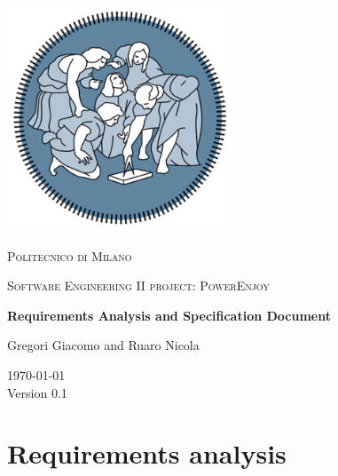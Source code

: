 \documentclass[openright]{report}
\def \version {0.1}
\begin{document}
	\begin{titlepage}
		\centering
		\includegraphics[width=0.50\textwidth]{polimi}\\\vspace{0.25cm}
		{\scshape\LARGE Politecnico di Milano\par}\vspace{0.25cm}
		{\scshape\Large Software Engineering II project: PowerEnjoy\par}\vspace{1.5cm}
		{\huge\bfseries Requirements Analysis and Specification Document\par}\vspace{1cm}
		{\large Gregori Giacomo and Ruaro Nicola\par}\vfill

		{\large \today \\Version \version}
	\end{titlepage}

    
    \tableofcontents

    \begin{abstract}
		The main purpose of this document is to give a specification of the requirements that our system has to fulfill adopting the IEEE-830 standard for RASD documentation. 
		It also introduces functional and non-functional requirements via high level specification of the system. 
		In the last part a formal model is presented using Alloy. 
		\\The information contained in this document is intended for the stakeholders and developers: for the stakeholders this document presents an useful description to understand the project development, meanwhile for the developers it’s quite a comfortable way to match the stakeholders' requests and the proposed solutions.
	\end{abstract}

    \part{Requirements analysis}
\end{document}
